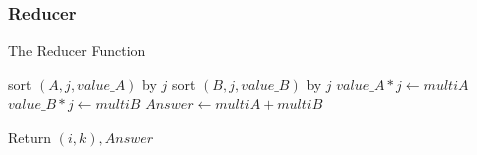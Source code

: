 \documentclass[twocolumn]{IEEEtran}
\begin{document}
	
	
	
		
	\subsubsection{Reducer}
	
		
		\begin{algorithm}
			\caption{The Reducer Function}
			\begin{algorithmic} 
				
							
				
				\STATE sort $(A, j, value\_ A)$ by $j$
				\STATE sort $(B, j, value\_ B)$ by $j$
				\STATE $value\_ A*j \leftarrow multiA$
				\STATE $value\_ B*j \leftarrow multiB$
				\STATE $ Answer \leftarrow  multiA + multiB$   
				
				\STATE Return $(i,k),Answer$
				\ENDFOR		
			
			\end{algorithmic}
		\end{algorithm}
	
	
	
\end{document}
